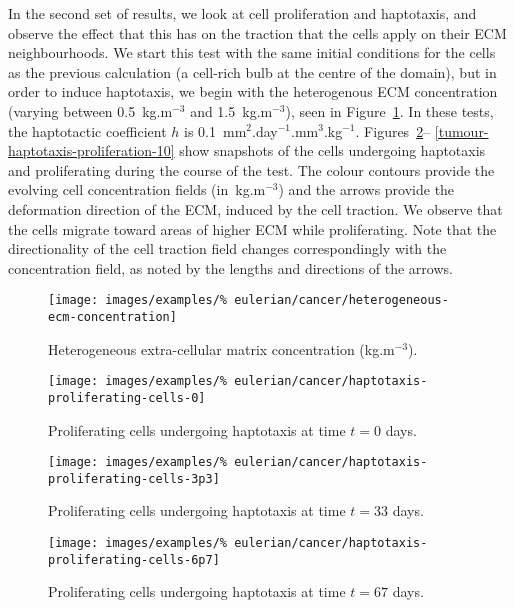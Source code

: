 \clearpage

In the second set of results, we look at cell proliferation and
haptotaxis, and observe the effect that this has on the traction that
the cells apply on their ECM neighbourhoods. We start this test with
the same initial conditions for the cells as the previous calculation
(a cell-rich bulb at the centre of the domain), but in order to induce
haptotaxis, we begin with the heterogenous ECM concentration (varying
between 0.5~kg.m$^{-3}$ and 1.5~kg.m$^{-3}$), seen in
Figure~\ref{heterogeneous-ecm-concentration}. In these tests, the
haptotactic coefficient $h$ is 0.1~mm$^2$.day$^{-1}$.mm$^3$.kg$^{-1}$.
Figures~\ref{tumour-haptotaxis-proliferation-0}--%
\ref{tumour-haptotaxis-proliferation-10} show snapshots of the cells
undergoing haptotaxis and proliferating during the course of the
test. The colour contours provide the evolving cell concentration
fields (in~kg.m$^{-3}$) and the arrows provide the deformation
direction of the ECM, induced by the cell traction. We observe that
the cells migrate toward areas of higher ECM while proliferating. Note
that the directionality of the cell traction field changes
correspondingly with the concentration field, as noted by the lengths
and directions of the arrows.

\begin{figure}[!hptb]
\centering
\texttt{[image: images/examples/\%
eulerian/cancer/heterogeneous-ecm-concentration]}
\caption{Heterogeneous extra-cellular matrix concentration
  (kg.m$^{-3}$).}
\label{heterogeneous-ecm-concentration}
\end{figure}

\begin{figure}[!hptb]
\centering
\texttt{[image: images/examples/\%
eulerian/cancer/haptotaxis-proliferating-cells-0]}
\caption{Proliferating cells undergoing haptotaxis at time $t=0$
  days.}
\label{tumour-haptotaxis-proliferation-0}
\end{figure}

\begin{figure}[!hptb]
\centering
\texttt{[image: images/examples/\%
eulerian/cancer/haptotaxis-proliferating-cells-3p3]}
\caption{Proliferating cells undergoing haptotaxis at time $t=33$
  days.} 
\label{tumour-haptotaxis-proliferation-3p3}
\end{figure}

\begin{figure}[!hptb]
\centering
\texttt{[image: images/examples/\%
eulerian/cancer/haptotaxis-proliferating-cells-6p7]}
\caption{Proliferating cells undergoing haptotaxis at time $t=67$
  days.}
\label{tumour-haptotaxis-proliferation-6p7}
\end{figure}

